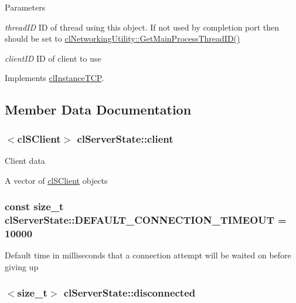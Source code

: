 \begin{DoxyParams}{Parameters}
\item[{\em threadID}]ID of thread using this object. If not used by completion port then should be set to \hyperlink{classcl_networking_utility_acb6168b9acdc70baeb9bc0fe7c5196bb}{clNetworkingUtility::GetMainProcessThreadID()} \item[{\em clientID}]ID of client to use \end{DoxyParams}


Implements \hyperlink{classcl_instance_t_c_p_acb97c70b1a0cdba98fd4ac0a658ed6ec}{clInstanceTCP}.



\subsection{Member Data Documentation}
\hypertarget{classcl_server_state_a4d04e7fec349fb69ac9d7d4278c7e915}{
\subsubsection[{client}]{$<${\bf clSClient}$>$ {\bf clServerState::client}}}
\label{classcl_server_state_a4d04e7fec349fb69ac9d7d4278c7e915}
Client data \par
 A vector of \hyperlink{classcl_s_client}{clSClient} objects \hypertarget{classcl_server_state_aa61be479aa559af84ebad2a136c2173b}{
\subsubsection[{DEFAULT\_\-CONNECTION\_\-TIMEOUT}]{\setlength{\rightskip}{0pt plus 5cm}const size\_\-t {\bf clServerState::DEFAULT\_\-CONNECTION\_\-TIMEOUT} = 10000}}
\label{classcl_server_state_aa61be479aa559af84ebad2a136c2173b}
Default time in milliseconds that a connection attempt will be waited on before giving up \hypertarget{classcl_server_state_a1928a46878962bc4d2c804bf21074319}{
\subsubsection[{disconnected}]{$<$size\_\-t$>$ {\bf clServerState::disconnected}}}
